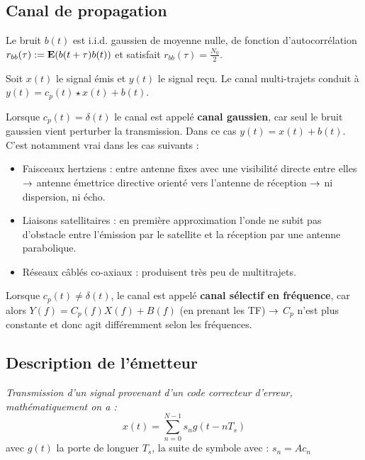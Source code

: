 \subsection{Canal de propagation}

	\begin{hyp}
		Le bruit $b(t)$ est i.i.d. gaussien de moyenne nulle, de fonction d'autocorrélation $r_{bb}(\tau) := \mathbf{E}(b(t + \tau) b(t))$ et satisfait $r_{bb}(\tau) = \frac{N_0}{2}$.
	\end{hyp}
	
	\begin{pop}
		Soit $x(t)$ le signal émis et $y(t)$ le signal reçu.
		Le canal multi-trajets conduit à $y(t) = c_p(t) \star x(t) + b(t)$.
	\end{pop}
	
	Lorsque $c_p(t) = \delta(t)$ le canal est appelé \textbf{canal gaussien}, car seul le bruit gaussien vient perturber la transmission.
	Dans ce cas $y(t) = x(t) + b(t)$.
	C'est notamment vrai dans les cas suivants :
	\begin{itemize}
	\item[\textbullet] Faisceaux hertziens : entre antenne fixes avec une visibilité directe entre elles $\rightarrow$ antenne émettrice directive orienté vers l'antenne de réception $\rightarrow$ ni dispersion, ni écho.
	\item[\textbullet] Liaisons satellitaires : en première approximation l'onde ne subit pas d'obstacle entre l'émission par le satellite et la réception par une antenne parabolique.
	\item[\textbullet] Réseaux câblés co-axiaux : produisent très peu de multitrajets.
	\end{itemize}
	
	Lorsque $c_p(t) \neq \delta(t)$, le canal est appelé \textbf{canal sélectif en fréquence}, car alors $Y(f) = C_p(f) X(f) + B(f)$ (en prenant les TF) $\rightarrow$ $C_p$ n'est plus constante et donc agit différemment selon les fréquences.
		

\subsection{Description de l'émetteur}

	\begin{defn}
	\textit{Transmission d'un signal provenant d'un code correcteur d'erreur, mathématiquement on a : }
	$$x(t)=\sum_{n=0}^{N-1} s_{n}g(t-nT_{s})$$
	avec $g(t)$ la porte de longuer $T_{s}$, la suite de symbole avec : $s_{n}=Ac_{n}$
	\end{defn}
	
